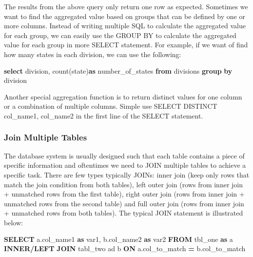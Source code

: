 \documentclass[
]{article}
\newenvironment{Shaded}{\begin{snugshade}}{\end{snugshade}}
\newcommand{\FunctionTok}[1]{\textcolor[rgb]{0.00,0.00,0.00}{#1}}
\newcommand{\KeywordTok}[1]{\textcolor[rgb]{0.13,0.29,0.53}{\textbf{#1}}}
\newcommand{\NormalTok}[1]{#1}
\newcommand{\OperatorTok}[1]{\textcolor[rgb]{0.81,0.36,0.00}{\textbf{#1}}}
\begin{document}
The results from the above query only return one row as expected.
Sometimes we want to find the aggregated value based on groups that can
be defined by one or more columns. Instead of writing multiple SQL to
calculate the aggregated value for each group, we can easily use the
GROUP BY to calculate the aggregated value for each group in more SELECT
statement. For example, if we want of find how many states in each
division, we can use the following:

\begin{Shaded}
\begin{Highlighting}[]
\KeywordTok{select}\NormalTok{ division, }\FunctionTok{count}\NormalTok{(state)}\KeywordTok{as}\NormalTok{ number_of_states}
\KeywordTok{from}\NormalTok{ divisions}
\KeywordTok{group} \KeywordTok{by}\NormalTok{ division}
\end{Highlighting}
\end{Shaded}

Another special aggregation function is to return distinct values for
one column or a combination of multiple columns. Simple use SELECT
DISTINCT col\_name1, col\_name2 in the first line of the SELECT
statement.

\hypertarget{join-multiple-tables}{%
\subsubsection{Join Multiple Tables}\label{join-multiple-tables}}

The database system is usually designed such that each table contains a
piece of specific information and oftentimes we need to JOIN multiple
tables to achieve a specific task. There are few types typically JOINs:
inner join (keep only rows that match the join condition from both
tables), left outer join (rows from inner join + unmatched rows from the
first table), right outer join (rows from inner join + unmatched rows
from the second table) and full outer join (rows from inner join +
unmatched rows from both tables). The typical JOIN statement is
illustrated below:

\begin{Shaded}
\begin{Highlighting}[]
\KeywordTok{SELECT}\NormalTok{ a.col_name1 }\KeywordTok{as}\NormalTok{ var1, b.col_name2 }\KeywordTok{as}\NormalTok{ var2}
\KeywordTok{FROM}\NormalTok{ tbl_one }\KeywordTok{as}\NormalTok{ a}
\KeywordTok{INNER}\OperatorTok{/}\KeywordTok{LEFT} \KeywordTok{JOIN}\NormalTok{ tabl_two ad b}
\KeywordTok{ON}\NormalTok{ a.col_to_match }\OperatorTok{=}\NormalTok{ b.col_to_match}
\end{Highlighting}
\end{Shaded}
\end{document}
